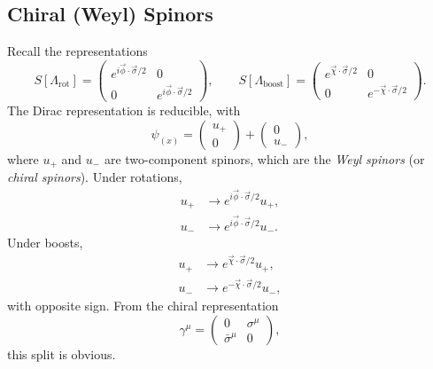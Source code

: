 \documentclass[12pt]{article}
\begin{document}

\subsection{Chiral (Weyl) Spinors}%
\label{sub:ch_sp}

Recall the representations
\[
	S[\Lambda_{\mathrm{rot}}] =
	\begin{pmatrix}
		e^{i \overrightarrow \phi \cdot \overrightarrow \sigma/2} & 0 \\
		0 & e^{i \overrightarrow \phi \cdot \overrightarrow \sigma/2}
	\end{pmatrix}, \qquad S[\Lambda_{\mathrm{boost}}] =
	\begin{pmatrix}
		e^{\overrightarrow \chi \cdot \overrightarrow \sigma/2} & 0 \\
		0 & e^{- \overrightarrow \chi \cdot \overrightarrow \sigma/2}
	\end{pmatrix}.
\]
The Dirac representation is reducible, with
\[
\psi_{(x)} =
\begin{pmatrix}
	u_+ \\ 0
\end{pmatrix} + 
\begin{pmatrix}
	0 \\ u_-
\end{pmatrix},
\]
where $u_+$ and $u_-$ are two-component spinors, which are the \emph{Weyl spinors} (or \emph{chiral spinors}). Under rotations,
\begin{align*}
	u_+ &\to e^{i \overrightarrow{\phi} \cdot \overrightarrow{\sigma}/2} u_+, \\
	u_- &\to e^{i \overrightarrow{\phi} \cdot \overrightarrow{\sigma}/2} u_-.
\end{align*}
Under boosts,
\begin{align*}
	u_+ &\to e^{\overrightarrow{\chi} \cdot \overrightarrow{\sigma}/2}u_+, \\
	u_- &\to e^{-\overrightarrow{\chi} \cdot \overrightarrow{\sigma}/2} u_-,
\end{align*}
with opposite sign. From the chiral representation
\[
\gamma^{\mu} =
\begin{pmatrix}
	0 & \sigma^{\mu} \\
	\bar \sigma^\mu & 0
\end{pmatrix},
\]
this split is obvious.
\end{document}
